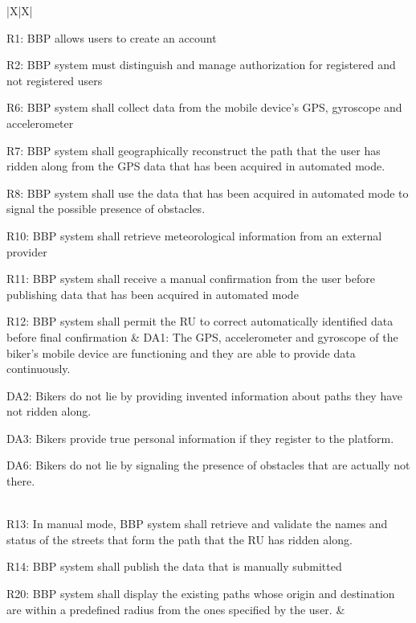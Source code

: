\documentclass{article}
\begin{document}
\newpage
\begin{xltabular}{\textwidth}{|X|X|}
    \hline
     \\
    \hline
 
    R1: BBP allows users to create an account \par
    R2: BBP system must distinguish and manage authorization for registered and not registered users \par
    R6: BBP system shall collect data from the mobile device’s GPS, gyroscope and accelerometer \par
    R7: BBP system shall geographically reconstruct the path that the user has ridden along from the GPS data that has been acquired in automated mode. \par
    R8: BBP system shall use the data that has been acquired in automated mode to signal the possible presence of obstacles. \par
    R10: BBP system shall retrieve meteorological information from an external provider \par
    R11: BBP system shall receive a manual confirmation from the user before publishing data that has been acquired in automated mode \par
    R12: BBP system shall permit the RU to correct automatically identified data before final confirmation 
    & 
    DA1: The GPS, accelerometer and gyroscope of the biker’s mobile device are functioning and they are able to provide data continuously.   \par
    DA2: Bikers do not lie by providing invented information about paths they have not ridden along. \par
    DA3: Bikers provide true personal information if they register to the platform. \par
    DA6: Bikers do not lie by signaling the presence of obstacles that are actually not there. \par
    \\
    R13: In manual mode, BBP system shall retrieve and validate the names and status of the streets that form the path that the RU has ridden along. \par
    R14: BBP system shall publish the data that is manually submitted \par
    R20: BBP system shall display the existing paths whose origin and destination are within a predefined radius from the ones specified by the user.  & 
    \\
    \hline
\end{xltabular}
\end{document}
